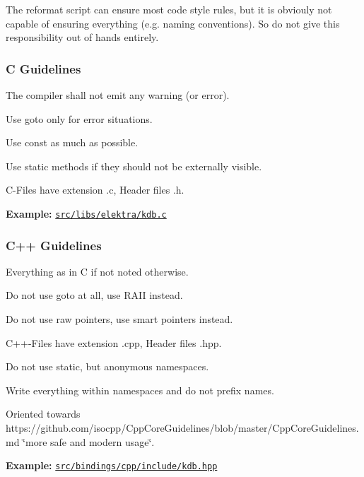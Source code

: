 The reformat script can ensure most code style rules, but it is obviouly not capable of ensuring everything (e.\+g. naming conventions). So do not give this responsibility out of hands entirely.

\subsubsection*{C Guidelines}


\begin{DoxyItemize}
\item The compiler shall not emit any warning (or error).
\item Use goto only for error situations.
\item Use {\ttfamily const} as much as possible.
\item Use {\ttfamily static} methods if they should not be externally visible.
\item C-\/\+Files have extension {\ttfamily .c}, Header files {\ttfamily .h}.
\end{DoxyItemize}

{\bfseries Example\+:} \href{/home/markus/Projekte/Elektra/current/src/libs/elektra/kdb.c}{\tt src/libs/elektra/kdb.\+c}

\subsubsection*{C++ Guidelines}


\begin{DoxyItemize}
\item Everything as in C if not noted otherwise.
\item Do not use goto at all, use R\+A\+I\+I instead.
\item Do not use raw pointers, use smart pointers instead.
\item C++-\/\+Files have extension {\ttfamily .cpp}, Header files {\ttfamily .hpp}.
\item Do not use {\ttfamily static}, but anonymous namespaces.
\item Write everything within namespaces and do not prefix names.
\item Oriented towards https\+://github.com/isocpp/\+Cpp\+Core\+Guidelines/blob/master/\+Cpp\+Core\+Guidelines.\+md \char`\"{}more safe and modern usage\char`\"{}.
\end{DoxyItemize}

{\bfseries Example\+:} \href{/home/markus/Projekte/Elektra/current/src/bindings/cpp/include/kdb.hpp}{\tt src/bindings/cpp/include/kdb.\+hpp}

